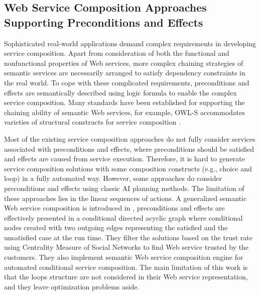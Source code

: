 \subsection{Web Service Composition Approaches Supporting Preconditions and Effects}\label{Semantic}
Sophisticated real-world applications demand complex requirements in developing service composition. Apart from consideration of both the functional and nonfunctional properties of Web services, more complex chaining strategies of semantic services are necessarily arranged to satisfy dependency constraints in the real world. To cope with these complicated requirements, preconditions and effects are semantically described using logic formula to enable the complex service composition. Many standards have been established for supporting the chaining ability of semantic Web services, for example, OWL-S accommodates varieties of structural constructs for service composition \cite{wang2014automated}.

Most of the existing service composition approaches do not fully consider services associated with preconditions and effects, where preconditions should be satisfied and effects are caused from service execution. Therefore, it is hard to generate service composition solutions with some composition constructs (e.g., choice and loop) in a fully automated way. However, some approaches do consider preconditions and effects using classic AI planning methods. The limitation of these approaches lies in the linear sequences of actions. A generalized semantic Web service composition is introduced in \cite{bansal2016generalized}, preconditions and effects are effectively presented in a conditional directed acyclic graph where conditional nodes created with two outgoing edges representing the satisfied and the unsatisfied case at the run time. They filter the solutions based on the trust rate using Centrality Measure of Social Networks to find Web service trusted by the customers. They also implement semantic Web service composition engine for automated conditional service composition. The main limitation of this work is that the loops structure are not considered in their Web service representation, and they leave optimization problems aside.

